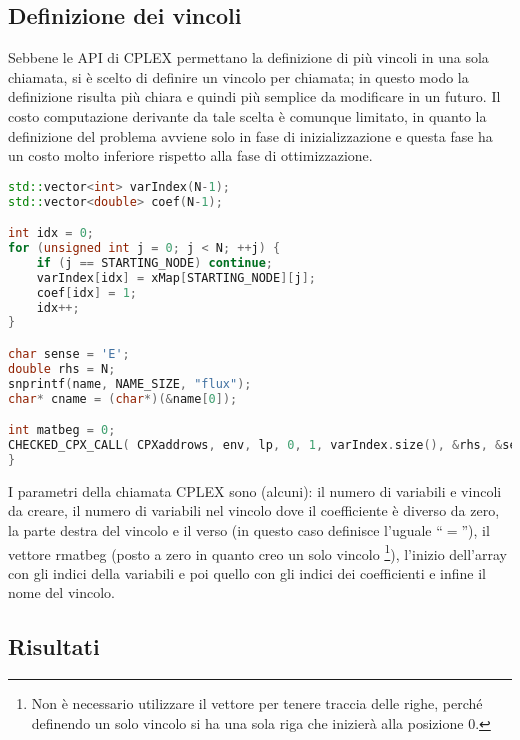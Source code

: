 \subsection{Definizione dei vincoli}
Sebbene le API di CPLEX permettano la definizione di più vincoli in una sola chiamata, si è scelto di definire un vincolo per chiamata;
in questo modo la definizione risulta più chiara e quindi più semplice da modificare in un futuro.
Il costo computazione derivante da tale scelta è comunque limitato, in quanto la definizione del problema avviene solo in fase di inizializzazione
e questa fase ha un costo molto inferiore rispetto alla fase di ottimizzazione.
%
\label{lst:cplex-vincoli}
\begin{lstlisting}[language=C++, caption=Creazione di un vincolo]
std::vector<int> varIndex(N-1);
std::vector<double> coef(N-1);

int idx = 0;
for (unsigned int j = 0; j < N; ++j) {
	if (j == STARTING_NODE) continue;
	varIndex[idx] = xMap[STARTING_NODE][j];
	coef[idx] = 1;
	idx++;
}

char sense = 'E';
double rhs = N;
snprintf(name, NAME_SIZE, "flux");
char* cname = (char*)(&name[0]);

int matbeg = 0;
CHECKED_CPX_CALL( CPXaddrows, env, lp, 0, 1, varIndex.size(), &rhs, &sense, &matbeg, &varIndex[0], &coef[0], NULL, &cname );
}
\end{lstlisting}
%
I parametri della chiamata CPLEX sono (alcuni): il numero di variabili e vincoli da creare, il numero di variabili nel vincolo dove il coefficiente è
diverso da zero, la parte destra del vincolo e il verso (in questo caso definisce l'uguale ``$=$''), il vettore \textsf{rmatbeg} (posto a zero in quanto creo un solo vincolo
\footnote{Non è necessario utilizzare il vettore per tenere traccia delle righe, perché definendo un solo vincolo si ha una sola riga che inizierà alla posizione 0.}),
l'inizio dell'array con gli indici della variabili e poi quello con gli indici dei coefficienti e infine il nome del vincolo.
\subsection{Risultati}
